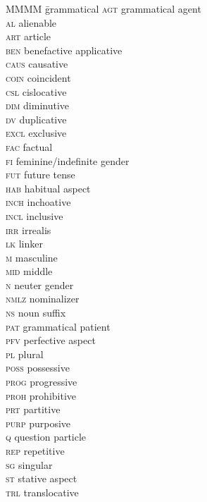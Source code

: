 \documentclass[output=paper]{langscibook}
\begin{document}
\begin{multicols}{2}
\begin{tabbing}
MMMM \= grammatical\kill
\textsc{agt} \> grammatical agent\\
\textsc{al} \> alienable\\
\textsc{art} \> article\\
\textsc{ben} \> benefactive applicative\\
\textsc{caus} \> causative\\
\textsc{coin} \> coincident\\
\textsc{csl} \> cislocative\\
\textsc{dim} \> diminutive\\
\textsc{dv} \> duplicative\\
\textsc{excl} \> exclusive\\
\textsc{fac} \> factual\\
\textsc{fi} \> feminine/indefinite gender\\
\textsc{fut} \> future tense\\
\textsc{hab} \> habitual aspect\\
\textsc{inch} \> inchoative\\
\textsc{incl} \> inclusive\\
\textsc{irr} \> irrealis\\
\textsc{lk} \> linker\\
\textsc{m} \> masculine\\
\textsc{mid} \> middle\\
\textsc{n} \> neuter gender\\
\textsc{nmlz} \> nominalizer\\
\textsc{ns} \> noun suffix\\
\textsc{pat} \> grammatical patient\\
\textsc{pfv} \> perfective aspect\\
\textsc{pl} \> plural\\
\textsc{poss} \> possessive\\
\textsc{prog} \> progressive\\
\textsc{proh} \> prohibitive\\
\textsc{prt} \> partitive\\
\textsc{purp} \> purposive\\
\textsc{q} \> question particle\\
\textsc{rep} \> repetitive\\
\textsc{sg} \> singular\\
\textsc{st} \> stative aspect\\
\textsc{trl} \> translocative
\end{tabbing}
\end{multicols}

\sloppy\printbibliography[heading=subbibliography,notkeyword=this]
\end{document}
